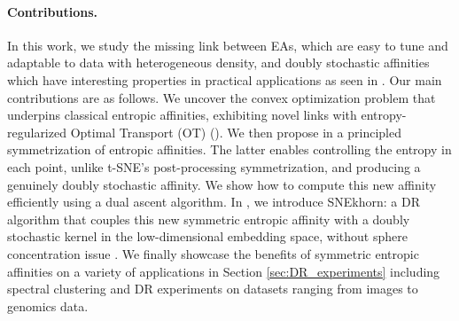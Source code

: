 \paragraph{Contributions.} In this work, we study the missing
link between EAs, which are easy to tune and adaptable to data with heterogeneous density, and doubly stochastic affinities which have interesting properties in practical applications as seen in . 
Our main contributions are as follows. We uncover the convex
optimization problem that underpins classical entropic affinities, exhibiting
novel links with entropy-regularized Optimal Transport (OT) (). We then propose in  a principled symmetrization of entropic
affinities. The latter enables controlling the entropy in each point, unlike
t-SNE's post-processing symmetrization, and producing a genuinely doubly stochastic affinity. We show how to
compute this new affinity efficiently using a dual ascent algorithm.
In , we introduce SNEkhorn: a DR algorithm that couples this new symmetric entropic affinity with a doubly stochastic kernel in the low-dimensional embedding space, without sphere concentration issue \cite{lu2019doubly}. We finally showcase the benefits of symmetric entropic affinities on a variety of applications in Section \ref{sec:DR_experiments} including spectral clustering and DR experiments on datasets ranging from images to genomics data.